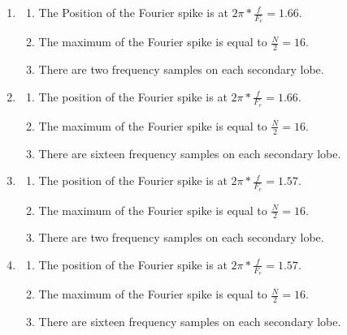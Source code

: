 \documentclass[]{article}
\begin{document}
\begin{enumerate}
    \item \begin{enumerate}
        \item The Position of the Fourier spike is at $2\pi*\frac{f}{F_e} = 1.66$.
        \item The maximum of the Fourier spike is equal to $\frac{N}{2}=16$.
        \item There are two frequency samples on each secondary lobe.
    \end{enumerate}
    \item \begin{enumerate}
        \item The position of the Fourier spike is at $2\pi*\frac{f}{F_e} = 1.66$.
        \item The maximum of the Fourier spike is equal to $\frac{N}{2}=16$.
        \item There are sixteen frequency samples on each secondary lobe.
    \end{enumerate}
    \item \begin{enumerate}
        \item The position of the Fourier spike is at $2\pi*\frac{f}{F_e} = 1.57$.
        \item The maximum of the Fourier spike is equal to $\frac{N}{2}=16$.
        \item There are two frequency samples on each secondary lobe.
    \end{enumerate}
    \item \begin{enumerate}
        \item The position of the Fourier spike is at $2\pi*\frac{f}{F_e} = 1.57$.
        \item The maximum of the Fourier spike is equal to $\frac{N}{2}=16$.
        \item There are sixteen frequency samples on each secondary lobe.
    \end{enumerate}
\end{enumerate}
\end{document}
